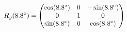 \documentclass[preview]{standalone}
\begin{document}
\begin{align*}
\special{dvisvgm:raw <g id='unique000'>}R_y(8.8^\circ) = \begin{pmatrix} \cos(8.8^\circ) & 0 & -\sin(8.8^\circ) \\ 0 & 1 & 0 \\ \sin(8.8^\circ) & 0 & \cos(8.8^\circ) \end{pmatrix}\special{dvisvgm:raw </g>}
\end{align*}
\end{document}
